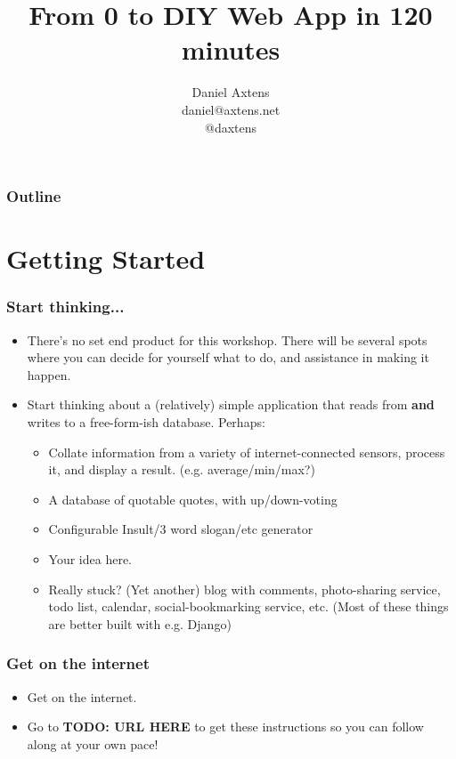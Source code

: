 \documentclass{beamer}
\title{From 0 to DIY Web App in 120 minutes}
\author[daniel@axtens.net]{Daniel Axtens\\daniel@axtens.net\\@daxtens}
\begin{document}
\begin{frame}[plain]
  \titlepage
\end{frame}


\begin{frame}
  \frametitle{Outline}
  \tableofcontents
\end{frame}


\section{Getting Started}

\begin{frame}
  \frametitle{Start thinking...}
  \begin{itemize}
  \item There's no set end product for this workshop. There will be
    several spots where you can decide for yourself what to do, and
    assistance in making it happen.

  \item Start thinking about a (relatively) simple application that
    reads from \textbf{and} writes to a free-form-ish database. Perhaps:
    \begin{itemize}
    \item Collate information from a variety of internet-connected
      sensors, process it, and display a
      result. (e.g. average/min/max?)
    \item A database of quotable quotes, with up/down-voting
    \item Configurable Insult/3 word slogan/etc
      generator
    \item Your idea here.
    \item Really stuck? (Yet another) blog with comments, photo-sharing service,
      todo list, calendar, social-bookmarking service, etc. (Most of
      these things are better built with e.g. Django)
    \end{itemize}
  \end{itemize}
\end{frame}

\begin{frame}
  \frametitle{Get on the internet}
  \begin{itemize}
  \item Get on the internet.

  \item Go to \textbf{TODO: URL HERE} to get these instructions so you
    can follow along at your own pace!
  \end{itemize}
\end{frame}
\end{document}
